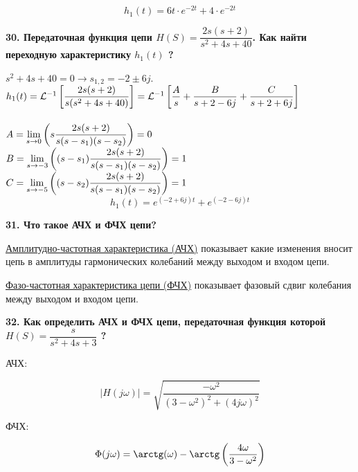 $$ h_{1}(t) = 6t \cdot e^{-2t} + 4 \cdot e^{-2t} $$

\textbf{
    30. Передаточная функция цепи 
    $ H(S) = \dfrac{2s(s + 2)}{s^{2} +4s + 40} $. 
    Как найти переходную характеристику $ h_{1}(t) $ ?
}

\renewcommand{\Hs}{\dfrac{2s(s + 2)}{s(s^{2} +4s + 40)}}
\newcommand{\Hss}{\dfrac{2s(s + 2)}{s(s-s_1)(s-s_2)}}


$ s^{2} +4s + 40 = 0 \rightarrow s_{1,2} = -2 \pm 6j $.\\

$ h_{1}(t) = \lag{\Hs} = 
\lag{\dfrac{A}{s} + \dfrac{B}{s + 2 - 6j} + \dfrac{C}{s + 2 + 6j}}
$\\\\

$ A = \mylim[s]{0}{s\Hss} = 0 $\\

$ B = \mylim[s]{-3}{(s-s_1)\Hss} = 1 $\\

$ C = \mylim[s]{-5}{(s-s_2)\Hss} = 1 $\\

$$ h_{1}(t) = e^{(-2 + 6j)t} + e^{(-2 - 6j)t} $$

\textbf{
    31. Что такое АЧХ и ФЧХ цепи?
}

\underline{Амплитудно-частотная характеристика (АЧХ)} 
показывает какие изменения вносит цепь в 
амплитуды гармонических колебаний 
между выходом и входом цепи.

\underline{Фазо-частотная характеристика цепи (ФЧХ)} 
показывает фазовый сдвиг колебания 
между выходом и входом цепи.

\textbf{
    32. Как определить АЧХ и ФЧХ цепи, 
    передаточная функция которой 
    $ H(S) = \dfrac{s}{s^{2} +4s + 3} $ ?
}

АЧХ: 

$$ |H(j\omega)| = 
\sqrt{\dfrac{-\omega^{2}}{(3-\omega^{2})^{2} + (4j\omega)^{2}}} $$

ФЧХ: 

$$ \Phi(j\omega) = \arctg(\omega) - 
\arctg\left(\dfrac{4\omega}{3 - \omega^{2}}\right) $$


